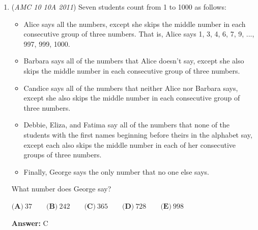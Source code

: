 \begin{enumerate}
 We know that the amount of choices must be a multiple of $6$, so $D$ is eliminated, leaving us with option $\boxed{\textbf{(C) } 3120}$



	\item (\textit{AMC 10 10A 2011}) Seven students count from 1 to 1000 as follows:


 
            \begin{itemize}
        \item Alice says all the numbers, except she skips the middle number in each consecutive group of three numbers. That is, Alice says 1, 3, 4, 6, 7, 9, ..., 997, 999, 1000.
            \end{itemize}
            
            \begin{itemize}
        \item Barbara says all of the numbers that Alice doesn't say, except she also skips the middle number in each consecutive group of three numbers.
            \end{itemize}
            
            \begin{itemize}
        \item Candice says all of the numbers that neither Alice nor Barbara says, except she also skips the middle number in each consecutive group of three numbers.
            \end{itemize}
            
            \begin{itemize}
        \item Debbie, Eliza, and Fatima say all of the numbers that none of the students with the first names beginning before theirs in the alphabet say, except each also skips the middle number in each of her consecutive groups of three numbers.
            \end{itemize}
            
            \begin{itemize}
        \item Finally, George says the only number that no one else says.
            \end{itemize}
            What number does George say?


 $\textbf{(A)}\ 37\qquad\textbf{(B)}\ 242\qquad\textbf{(C)}\ 365\qquad\textbf{(D)}\ 728\qquad\textbf{(E)}\ 998$

 \textbf{Answer: }C




\end{enumerate}
